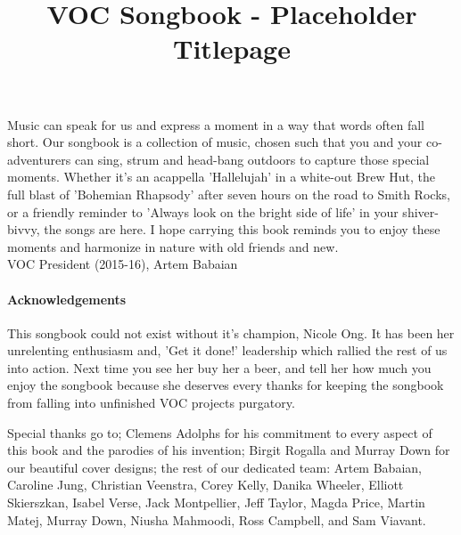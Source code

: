 \documentclass{article}
\begin{document}
\title{VOC Songbook - Placeholder Titlepage}
\begin{titlepage}
\maketitle
\thispagestyle{empty}
\end{titlepage}

\newpage


Music can speak for us and express a moment in a way that words often fall
short. Our songbook is a collection of music, chosen such that you and your
co-adventurers can sing, strum and head-bang outdoors to capture those special
moments. Whether it's an acappella 'Hallelujah' in a white-out Brew Hut, the
full blast of 'Bohemian Rhapsody' after seven hours on the road to Smith Rocks,
or a friendly reminder to 'Always look on the bright side of life' in your
shiver-bivvy, the songs are here. I hope carrying this book reminds you to
enjoy these moments and harmonize in nature with old friends and new.
\\[\medskipamount]

VOC President (2015-16), Artem Babaian

\paragraph{Acknowledgements}
This songbook could not exist without it's champion, Nicole Ong. It has been
her unrelenting enthusiasm and, 'Get it done!' leadership which rallied the
rest of us into action. Next time you see her buy her a beer, and tell her how
much you enjoy the songbook because she deserves every thanks for keeping the
songbook from falling into unfinished VOC projects purgatory.

Special thanks go to; Clemens Adolphs for his commitment to every aspect of
this book and the parodies of his invention; Birgit Rogalla and Murray Down for
our beautiful cover designs; the rest of our dedicated team: Artem Babaian,
Caroline Jung, Christian Veenstra, Corey Kelly, Danika Wheeler, Elliott
Skierszkan, Isabel Verse, Jack Montpellier, Jeff Taylor, Magda Price, Martin
Matej, Murray Down, Niusha Mahmoodi, Ross Campbell, and Sam Viavant.

\newpage

\flushbottom
\end{document}
